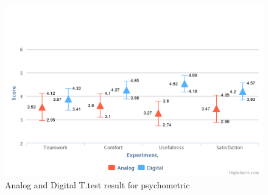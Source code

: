 \documentclass{sigchi}
\begin{document}
\begin{figure}[!h]
\centering
\includegraphics[width=1.0\columnwidth]{psycho}
\caption{Analog and Digital T.test result for psychometric }
\label{fig:figure1}
\end{figure}
\end{document}
